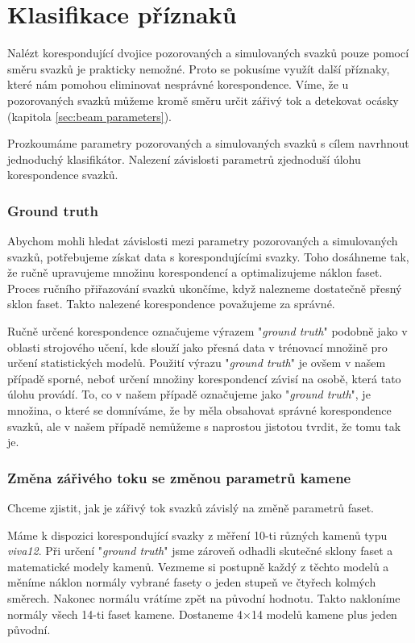 \part{Klasifikace příznaků}

Nalézt korespondující dvojice pozorovaných a simulovaných svazků pouze pomocí směru svazků je prakticky nemožné. Proto se pokusíme využít další příznaky, které nám pomohou eliminovat nesprávné korespondence. Víme, že u pozorovaných svazků můžeme kromě směru určit zářivý tok a detekovat ocásky (kapitola \ref{sec:beam parameters}).   

Prozkoumáme parametry pozorovaných a simulovaných svazků s cílem navrhnout jednoduchý klasifikátor. Nalezení závislosti parametrů zjednoduší úlohu korespondence svazků.  
\vspace{4mm}

\section{Ground truth}

Abychom mohli hledat závislosti mezi parametry pozorovaných a simulovaných svazků, potřebujeme získat data s korespondujícími svazky. Toho dosáhneme tak, že ručně upravujeme množinu korespondencí a optimalizujeme náklon faset. Proces ručního přiřazování svazků ukončíme, když nalezneme dostatečně přesný sklon faset. Takto nalezené korespondence považujeme za správné.    

Ručně určené korespondence označujeme výrazem "\textit{ground truth}" podobně jako v oblasti strojového učení, kde slouží jako přesná data v trénovací množině pro určení statistických modelů. Použití výrazu "\textit{ground truth}" je ovšem v našem případě sporné, neboť určení množiny korespondencí závisí na osobě, která tato úlohu provádí. To, co v našem případě označujeme jako "\textit{ground truth}", je množina, o které se domníváme, že by měla obsahovat správné korespondence svazků, ale v našem případě nemůžeme s naprostou jistotou tvrdit, že tomu tak je. 

\section{Změna zářivého toku se změnou parametrů kamene}
\label{sec: zmena_tok }

	Chceme zjistit, jak je zářivý tok svazků závislý na změně parametrů faset. 

	Máme k dispozici korespondující svazky z měření 10-ti různých kamenů typu \textit{viva12}. Při určení "\textit{ground truth}" jsme zároveň odhadli skutečné sklony faset a matematické modely kamenů. Vezmeme si postupně každý z těchto modelů a měníme náklon normály vybrané fasety o jeden stupeň ve čtyřech kolmých směrech. Nakonec normálu vrátíme zpět na původní hodnotu. Takto nakloníme normály všech 14-ti faset kamene. Dostaneme 4$\times$14 modelů kamene plus jeden původní. 
	
